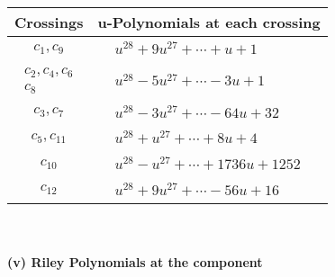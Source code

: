 \documentclass[1p]{elsarticle_modified}
\theoremstyle{definition}
\begin{document}
\begin{tabular}{m{50pt}|m{274pt}}
Crossings & \hspace{64pt}u-Polynomials at each crossing \\
\hline $$\begin{aligned}c_{1},c_{9}\end{aligned}$$&$\begin{aligned}
&u^{28}+9 u^{27}+\cdots+u+1
\end{aligned}$\\
\hline $$\begin{aligned}c_{2},c_{4},c_{6}\\c_{8}\end{aligned}$$&$\begin{aligned}
&u^{28}-5 u^{27}+\cdots-3 u+1
\end{aligned}$\\
\hline $$\begin{aligned}c_{3},c_{7}\end{aligned}$$&$\begin{aligned}
&u^{28}-3 u^{27}+\cdots-64 u+32
\end{aligned}$\\
\hline $$\begin{aligned}c_{5},c_{11}\end{aligned}$$&$\begin{aligned}
&u^{28}+u^{27}+\cdots+8 u+4
\end{aligned}$\\
\hline $$\begin{aligned}c_{10}\end{aligned}$$&$\begin{aligned}
&u^{28}- u^{27}+\cdots+1736 u+1252
\end{aligned}$\\
\hline $$\begin{aligned}c_{12}\end{aligned}$$&$\begin{aligned}
&u^{28}+9 u^{27}+\cdots-56 u+16
\end{aligned}$\\
\hline
\end{tabular}\\~\\
\newpage\renewcommand{\arraystretch}{1}
\flushleft \textbf{(v) Riley Polynomials at the component}\newline \\
\end{document}

